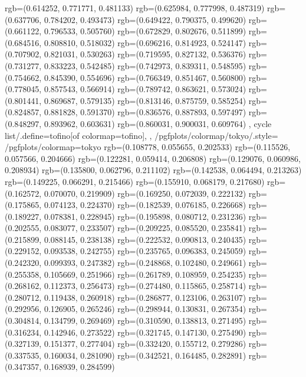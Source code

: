 {{{					rgb=(0.614252, 0.771771, 0.481133)
					rgb=(0.625984, 0.777998, 0.487319)
					rgb=(0.637706, 0.784202, 0.493473)
					rgb=(0.649422, 0.790375, 0.499620)
					rgb=(0.661122, 0.796533, 0.505760)
					rgb=(0.672829, 0.802676, 0.511899)
					rgb=(0.684516, 0.808810, 0.518032)
					rgb=(0.696216, 0.814923, 0.524147)
					rgb=(0.707902, 0.821031, 0.530263)
					rgb=(0.719595, 0.827132, 0.536376)
					rgb=(0.731277, 0.833223, 0.542485)
					rgb=(0.742973, 0.839311, 0.548595)
					rgb=(0.754662, 0.845390, 0.554696)
					rgb=(0.766349, 0.851467, 0.560800)
					rgb=(0.778045, 0.857543, 0.566914)
					rgb=(0.789742, 0.863621, 0.573024)
					rgb=(0.801441, 0.869687, 0.579135)
					rgb=(0.813146, 0.875759, 0.585254)
					rgb=(0.824857, 0.881828, 0.591370)
					rgb=(0.836576, 0.887893, 0.597497)
					rgb=(0.848297, 0.893962, 0.603631)
					rgb=(0.860031, 0.900031, 0.609764)
			},
		cycle list/.define={tofino}{[of colormap=tofino]},
		},
		/pgfplots/colormap/tokyo/.style={
			/pgfplots/colormap={tokyo}{%
					rgb=(0.108778, 0.055655, 0.202533)
					rgb=(0.115526, 0.057566, 0.204666)
					rgb=(0.122281, 0.059414, 0.206808)
					rgb=(0.129076, 0.060986, 0.208934)
					rgb=(0.135800, 0.062796, 0.211102)
					rgb=(0.142538, 0.064494, 0.213263)
					rgb=(0.149225, 0.066291, 0.215466)
					rgb=(0.155910, 0.068179, 0.217680)
					rgb=(0.162572, 0.070070, 0.219909)
					rgb=(0.169250, 0.072039, 0.222132)
					rgb=(0.175865, 0.074123, 0.224370)
					rgb=(0.182539, 0.076185, 0.226668)
					rgb=(0.189227, 0.078381, 0.228945)
					rgb=(0.195898, 0.080712, 0.231236)
					rgb=(0.202555, 0.083077, 0.233507)
					rgb=(0.209225, 0.085520, 0.235841)
					rgb=(0.215899, 0.088145, 0.238138)
					rgb=(0.222532, 0.090813, 0.240435)
					rgb=(0.229152, 0.093538, 0.242755)
					rgb=(0.235765, 0.096383, 0.245059)
					rgb=(0.242320, 0.099393, 0.247382)
					rgb=(0.248868, 0.102480, 0.249661)
					rgb=(0.255358, 0.105669, 0.251966)
					rgb=(0.261789, 0.108959, 0.254235)
					rgb=(0.268162, 0.112373, 0.256473)
					rgb=(0.274480, 0.115865, 0.258714)
					rgb=(0.280712, 0.119438, 0.260918)
					rgb=(0.286877, 0.123106, 0.263107)
					rgb=(0.292956, 0.126905, 0.265246)
					rgb=(0.298944, 0.130831, 0.267354)
					rgb=(0.304814, 0.134799, 0.269469)
					rgb=(0.310590, 0.138813, 0.271495)
					rgb=(0.316234, 0.142946, 0.273522)
					rgb=(0.321745, 0.147130, 0.275490)
					rgb=(0.327139, 0.151377, 0.277404)
					rgb=(0.332420, 0.155712, 0.279286)
					rgb=(0.337535, 0.160034, 0.281090)
					rgb=(0.342521, 0.164485, 0.282891)
					rgb=(0.347357, 0.168939, 0.284599)
}}}
